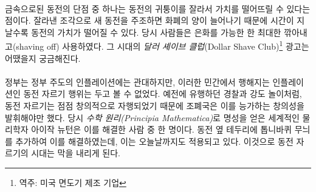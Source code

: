 \paragraph{}
\begin{comment}
	One of the downsides of using precious metal coins is that they can be
	clipped, effectively debasing the value of the coin. New coins can be
	minted from the clippings, inflating the money supply over time,
	devaluing every individual coin in the process. People were literally
	shaving off as much as they could get away with of their silver dollars.
	I wonder what kind of \textit{Dollar Shave Club} advertisements they had back
	in the day.
\end{comment}
금속으로된 동전의 단점 중 하나는 동전의 귀퉁이를 잘라서 가치를 떨어뜨릴 수 있다는 점이다. 
잘라낸 조각으로 새 동전을 주조하면 화폐의 양이 늘어나기 때문에 시간이 지날수록 동전의 가치가 떨어질 수 있다.
당시 사람들은 은화를 가능한 한 최대한 깎아내고(shaving off) 사용하였다.
그 시대의 \textit{달러 셰이브 클럽}(Dollar Shave Club)\footnote{역주: 미국 면도기 제조 기업} 광고는 어땠을지 궁금해진다.

\paragraph{}
\begin{comment}
	Since governments are only cool with inflation if they are the ones
	doing it, efforts were made to stop this guerrilla debasement. In
	classic cops-and-robbers fashion, coin clippers got ever more creative
	with their techniques, forcing the \enquote{masters of the mint} to get even
	more creative with their countermeasures. Isaac Newton, the
	world-renowned physicist of \textit{Principia Mathematica} fame, used to be one
	of these masters. He is attributed with adding the small stripes at the
	side of coins which are still present today. Gone were the days of easy
	coin shaving.
\end{comment}
정부는 정부 주도의 인플레이션에는 관대하지만, 
이러한 민간에서 행해지는 인플레이션인 동전 자르기 행위는 두고 볼 수 없었다. 
예전에 유행하던 경찰과 강도 놀이처럼, 
동전 자르기는 점점 창의적으로 자행되었기 때문에 조폐국은 이를 능가하는 창의성을 발휘해야만 했다.
당시 \textit{수학 원리(Principia Mathematica)}로 명성을 얻은 세계적인 물리학자 아이작 뉴턴은 이를 해결한 사람 중 한 명이다. 
동전 옆 테두리에 톱니바퀴 무늬를 추가하여 이를 해결하였는데, 이는 오늘날까지도 적용되고 있다.
이것으로 동전 자르기의 시대는 막을 내리게 된다.

